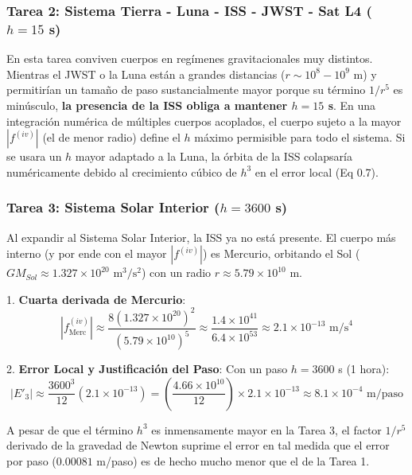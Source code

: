 \documentclass[11pt, a4paper]{article}
\begin{document}
	\subsubsection{Tarea 2: Sistema Tierra - Luna - ISS - JWST - Sat L4 ($h = 15$ s)}
	
	En esta tarea conviven cuerpos en regímenes gravitacionales muy distintos. Mientras el JWST o la Luna están a grandes distancias ($r \sim 10^8 - 10^9$ m) y permitirían un tamaño de paso sustancialmente mayor porque su término $1/r^5$ es minúsculo, \textbf{la presencia de la ISS obliga a mantener $h = 15$ s}. En una integración numérica de múltiples cuerpos acoplados, el cuerpo sujeto a la mayor $|f^{(iv)}|$ (el de menor radio) define el $h$ máximo permisible para todo el sistema. Si se usara un $h$ mayor adaptado a la Luna, la órbita de la ISS colapsaría numéricamente debido al crecimiento cúbico de $h^3$ en el error local (Eq 0.7).
	
	\subsubsection{Tarea 3: Sistema Solar Interior ($h = 3600$ s)}
	
	Al expandir al Sistema Solar Interior, la ISS ya no está presente. El cuerpo más interno (y por ende con el mayor $|f^{(iv)}|$) es Mercurio, orbitando el Sol ($GM_{Sol} \approx 1.327 \times 10^{20} \text{ m}^3/\text{s}^2$) con un radio $r \approx 5.79 \times 10^{10}$ m.
	
	1. \textbf{Cuarta derivada de Mercurio}:
	$$ |f^{(iv)}_{\text{Merc}}| \approx \frac{8(1.327 \times 10^{20})^2}{(5.79 \times 10^{10})^5} \approx \frac{1.4 \times 10^{41}}{6.4 \times 10^{53}} \approx 2.1 \times 10^{-13} \text{ m/s}^4 $$
	
	2. \textbf{Error Local y Justificación del Paso}:
	Con un paso $h = 3600$ s (1 hora):
	$$ |E'_3| \approx \frac{3600^3}{12} (2.1 \times 10^{-13}) = \left(\frac{4.66 \times 10^{10}}{12}\right) \times 2.1 \times 10^{-13} \approx 8.1 \times 10^{-4} \text{ m/paso} $$
	
	A pesar de que el término $h^3$ es inmensamente mayor en la Tarea 3, el factor $1/r^5$ derivado de la gravedad de Newton suprime el error en tal medida que el error por paso ($0.00081$ m/paso) es de hecho mucho menor que el de la Tarea 1.
	
\end{document}
